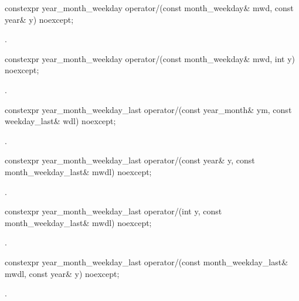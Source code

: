 \begin{itemdecl}
constexpr year_month_weekday
  operator/(const month_weekday& mwd, const year& y) noexcept;
\end{itemdecl}

\begin{itemdescr}
\pnum
\returns
{}.
\end{itemdescr}

\begin{itemdecl}
constexpr year_month_weekday
  operator/(const month_weekday& mwd, int y) noexcept;
\end{itemdecl}

\begin{itemdescr}
\pnum
\returns
{}.
\end{itemdescr}

\begin{itemdecl}
constexpr year_month_weekday_last
  operator/(const year_month& ym, const weekday_last& wdl) noexcept;
\end{itemdecl}

\begin{itemdescr}
\pnum
\returns
{}.
\end{itemdescr}

\begin{itemdecl}
constexpr year_month_weekday_last
  operator/(const year& y, const month_weekday_last& mwdl) noexcept;
\end{itemdecl}

\begin{itemdescr}
\pnum
\returns
{}.
\end{itemdescr}

\begin{itemdecl}
constexpr year_month_weekday_last
  operator/(int y, const month_weekday_last& mwdl) noexcept;
\end{itemdecl}

\begin{itemdescr}
\pnum
\returns
{}.
\end{itemdescr}

\begin{itemdecl}
constexpr year_month_weekday_last
  operator/(const month_weekday_last& mwdl, const year& y) noexcept;
\end{itemdecl}

\begin{itemdescr}
\pnum
\returns
{}.
\end{itemdescr}

